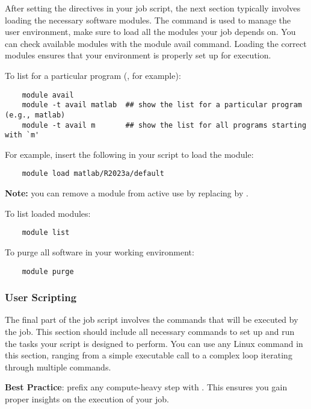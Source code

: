 After setting the directives in your job script, the next section typically involves loading
the necessary software modules. The  command is used to manage the user environment,
make sure to load all the modules your job depends on. You can check available modules with the
module avail command. Loading the correct modules ensures that your environment is properly
set up for execution.

\noindent To list for a particular program (, for example):
\small
\begin{verbatim}
    module avail
    module -t avail matlab  ## show the list for a particular program (e.g., matlab)
    module -t avail m       ## show the list for all programs starting with `m'
\end{verbatim}
\normalsize

For example, insert the following in your script to load the  module:
\begin{verbatim}
    module load matlab/R2023a/default
\end{verbatim}

\textbf{Note:} you can remove a module from active use by replacing  by .

To list loaded modules:
\begin{verbatim}
    module list
\end{verbatim}

To purge all software in your working environment:
\begin{verbatim}
    module purge
\end{verbatim}

\subsubsection{User Scripting}
\label{sect:scripting}
%
%

The final part of the job script involves the commands that will be executed by the job.
This section should include all necessary commands to set up and run the tasks
your script is designed to perform. You can use any Linux command in this section,
ranging from a simple executable call to a complex loop iterating through multiple commands.

\noindent \textbf{Best Practice}: prefix any compute-heavy step with .
This ensures you gain proper insights on the execution of your job.

